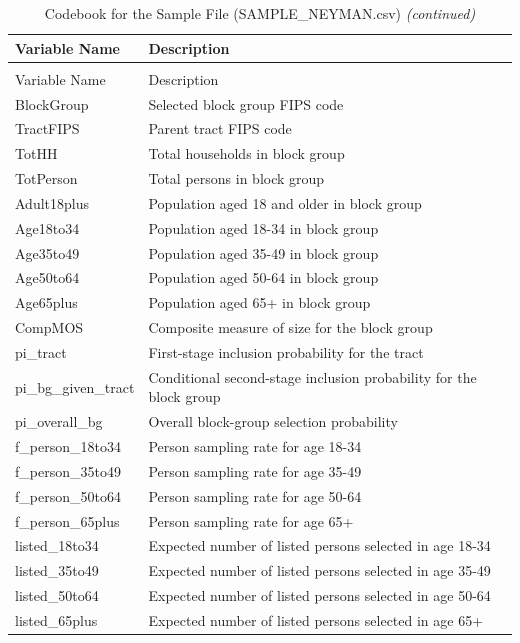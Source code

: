 \documentclass[
  11pt,
  letterpaper,
  DIV=11,
  numbers=noendperiod]{scrartcl}
\begin{document}
\begin{longtable}[t]{ll}
\caption{\label{tab:codebook-tables}Codebook for the Sample File (SAMPLE\_NEYMAN.csv)}\\
\toprule
Variable Name & Description\\
\midrule
\endfirsthead
\caption[]{Codebook for the Sample File (SAMPLE\_NEYMAN.csv) \textit{(continued)}}\\
\toprule
Variable Name & Description\\
\midrule
\endhead

\endfoot
\bottomrule
\endlastfoot
BlockGroup & Selected block group FIPS code\\
TractFIPS & Parent tract FIPS code\\
TotHH & Total households in block group\\
TotPerson & Total persons in block group\\
Adult18plus & Population aged 18 and older in block group\\
Age18to34 & Population aged 18-34 in block group\\
Age35to49 & Population aged 35-49 in block group\\
Age50to64 & Population aged 50-64 in block group\\
Age65plus & Population aged 65+ in block group\\
CompMOS & Composite measure of size for the block group\\
pi\_tract & First-stage inclusion probability for the tract\\
pi\_bg\_given\_tract & Conditional second-stage inclusion probability for the block group\\
pi\_overall\_bg & Overall block-group selection probability\\
f\_person\_18to34 & Person sampling rate for age 18-34\\
f\_person\_35to49 & Person sampling rate for age 35-49\\
f\_person\_50to64 & Person sampling rate for age 50-64\\
f\_person\_65plus & Person sampling rate for age 65+\\
listed\_18to34 & Expected number of listed persons selected in age 18-34\\
listed\_35to49 & Expected number of listed persons selected in age 35-49\\
listed\_50to64 & Expected number of listed persons selected in age 50-64\\
listed\_65plus & Expected number of listed persons selected in age 65+\\

\end{longtable}
\end{document}
